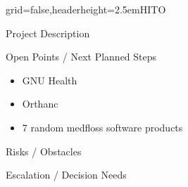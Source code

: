 \documentclass[english]{kiesgrube}
\begin{document}
\begin{poster}{grid=false,headerheight=2.5em}{}{HITO}{}{}
\begin{posterbox}[name=description,column=1,row=0]{Project Description}
\end{posterbox}
\begin{posterbox}[name=open,column=1,below=description]{Open Points / Next Planned Steps}
\begin{itemize}
\item GNU Health
\item Orthanc
\item 7 random medfloss software products
\end{itemize}
\end{posterbox}
\begin{posterbox}[name=risks,column=1,below=open]{Risks / Obstacles}
\end{posterbox}
\begin{posterbox}[name=escalation,column=1,below=risks]{Escalation / Decision Needs}
\end{posterbox}
\footer{}
\end{poster}

\newpage
\end{document}
